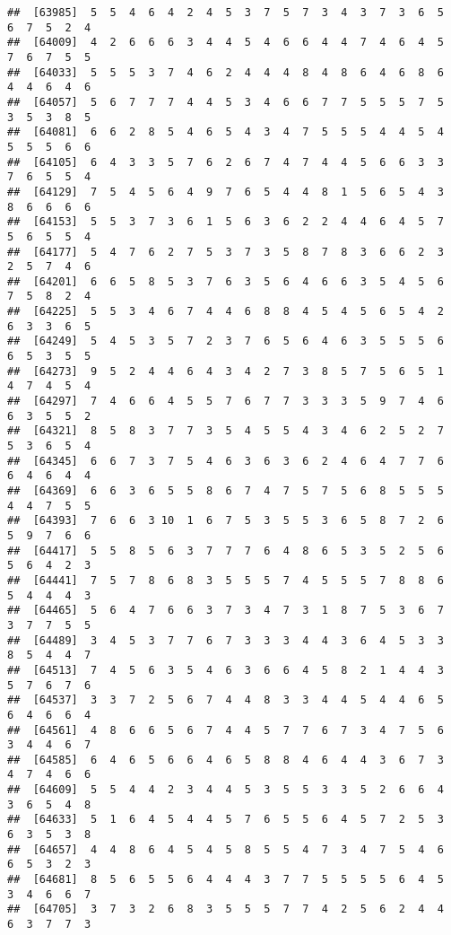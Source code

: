 \documentclass[
]{book}
\begin{document}
\begin{verbatim}
##  [63985]  5  5  4  6  4  2  4  5  3  7  5  7  3  4  3  7  3  6  5  6  7  5  2  4
##  [64009]  4  2  6  6  6  3  4  4  5  4  6  6  4  4  7  4  6  4  5  7  6  7  5  5
##  [64033]  5  5  5  3  7  4  6  2  4  4  4  8  4  8  6  4  6  8  6  4  4  6  4  6
##  [64057]  5  6  7  7  7  4  4  5  3  4  6  6  7  7  5  5  5  7  5  3  5  3  8  5
##  [64081]  6  6  2  8  5  4  6  5  4  3  4  7  5  5  5  4  4  5  4  5  5  5  6  6
##  [64105]  6  4  3  3  5  7  6  2  6  7  4  7  4  4  5  6  6  3  3  7  6  5  5  4
##  [64129]  7  5  4  5  6  4  9  7  6  5  4  4  8  1  5  6  5  4  3  8  6  6  6  6
##  [64153]  5  5  3  7  3  6  1  5  6  3  6  2  2  4  4  6  4  5  7  5  6  5  5  4
##  [64177]  5  4  7  6  2  7  5  3  7  3  5  8  7  8  3  6  6  2  3  2  5  7  4  6
##  [64201]  6  6  5  8  5  3  7  6  3  5  6  4  6  6  3  5  4  5  6  7  5  8  2  4
##  [64225]  5  5  3  4  6  7  4  4  6  8  8  4  5  4  5  6  5  4  2  6  3  3  6  5
##  [64249]  5  4  5  3  5  7  2  3  7  6  5  6  4  6  3  5  5  5  6  6  5  3  5  5
##  [64273]  9  5  2  4  4  6  4  3  4  2  7  3  8  5  7  5  6  5  1  4  7  4  5  4
##  [64297]  7  4  6  6  4  5  5  7  6  7  7  3  3  3  5  9  7  4  6  6  3  5  5  2
##  [64321]  8  5  8  3  7  7  3  5  4  5  5  4  3  4  6  2  5  2  7  5  3  6  5  4
##  [64345]  6  6  7  3  7  5  4  6  3  6  3  6  2  4  6  4  7  7  6  6  4  6  4  4
##  [64369]  6  6  3  6  5  5  8  6  7  4  7  5  7  5  6  8  5  5  5  4  4  7  5  5
##  [64393]  7  6  6  3 10  1  6  7  5  3  5  5  3  6  5  8  7  2  6  5  9  7  6  6
##  [64417]  5  5  8  5  6  3  7  7  7  6  4  8  6  5  3  5  2  5  6  5  6  4  2  3
##  [64441]  7  5  7  8  6  8  3  5  5  5  7  4  5  5  5  7  8  8  6  5  4  4  4  3
##  [64465]  5  6  4  7  6  6  3  7  3  4  7  3  1  8  7  5  3  6  7  3  7  7  5  5
##  [64489]  3  4  5  3  7  7  6  7  3  3  3  4  4  3  6  4  5  3  3  8  5  4  4  7
##  [64513]  7  4  5  6  3  5  4  6  3  6  6  4  5  8  2  1  4  4  3  5  7  6  7  6
##  [64537]  3  3  7  2  5  6  7  4  4  8  3  3  4  4  5  4  4  6  5  6  4  6  6  4
##  [64561]  4  8  6  6  5  6  7  4  4  5  7  7  6  7  3  4  7  5  6  3  4  4  6  7
##  [64585]  6  4  6  5  6  6  4  6  5  8  8  4  6  4  4  3  6  7  3  4  7  4  6  6
##  [64609]  5  5  4  4  2  3  4  4  5  3  5  5  3  3  5  2  6  6  4  3  6  5  4  8
##  [64633]  5  1  6  4  5  4  4  5  7  6  5  5  6  4  5  7  2  5  3  6  3  5  3  8
##  [64657]  4  4  8  6  4  5  4  5  8  5  5  4  7  3  4  7  5  4  6  6  5  3  2  3
##  [64681]  8  5  6  5  5  6  4  4  4  3  7  7  5  5  5  5  6  4  5  3  4  6  6  7
##  [64705]  3  7  3  2  6  8  3  5  5  5  7  7  4  2  5  6  2  4  4  6  3  7  7  3

\end{verbatim}
\end{document}
